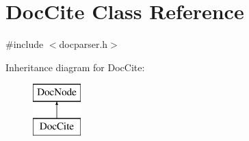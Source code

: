 \hypertarget{class_doc_cite}{}\section{Doc\+Cite Class Reference}
\label{class_doc_cite}


{\ttfamily \#include $<$docparser.\+h$>$}

Inheritance diagram for Doc\+Cite\+:\begin{figure}[H]
\begin{center}
\leavevmode
\includegraphics[height=2.000000cm]{class_doc_cite}
\end{center}
\end{figure}
